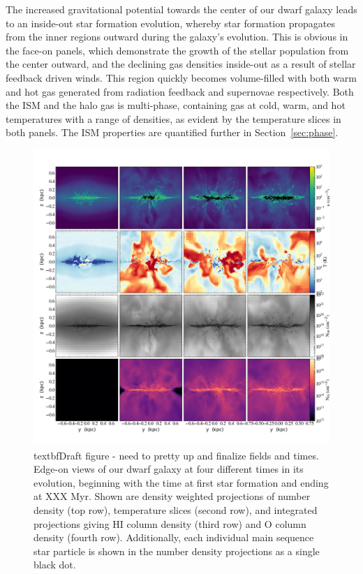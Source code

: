 \documentclass[twocolumn]{aastex61}
\begin{document}
The increased gravitational potential towards the center of our dwarf galaxy leads to an inside-out star formation evolution, whereby star formation propagates from the inner regions outward during the galaxy's evolution. This is obvious in the face-on panels, which demonstrate the growth of the stellar population from the center outward, and the declining gas densities inside-out as a result of stellar feedback driven winds. This region quickly becomes volume-filled with both warm and hot gas generated from radiation feedback and supernovae respectively. Both the ISM and the halo gas is multi-phase, containing gas at cold, warm, and hot temperatures with a range of densities, as evident by the temperature slices in both panels. The ISM properties are quantified further in Section~\ref{sec:phase}.

\begin{figure}
\centering
\includegraphics[width=0.975\linewidth]{multiplot_4x4_x.png}
\caption{textbf{Draft figure - need to pretty up and finalize fields and times.} Edge-on views of our dwarf galaxy at four different times in its evolution, beginning with the time at first star formation and ending at XXX Myr. Shown are density weighted projections of number density (top row), temperature slices (second row), and integrated projections giving HI column density (third row) and O column density (fourth row). Additionally, each individual main sequence star particle is shown in the number density projections as a single black dot.}
\label{fig:panel_x}
\end{figure}
\end{document}
